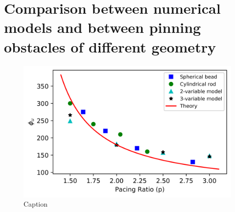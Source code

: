 \documentclass[%
 preprint,
 amsmath,amssymb,
 aps,
]{revtex4-2}
\begin{document}
\appendix

\section{Comparison between numerical models and between pinning obstacles of different geometry}

\begin{figure}[H]
    \centering
    \includegraphics{appendix_23oregonator_beadrod.png}
    \caption{Caption}
    \label{fig:unpinning_comparison}
\end{figure}


\nocite{*}

\end{document}
